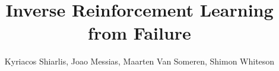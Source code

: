 \documentclass[conference]{IEEEtran}
\begin{document}
\title{Inverse Reinforcement Learning from Failure}

\author{Kyriacos Shiarlis, Joao Messias, Maarten Van Someren, Shimon Whiteson}





% 


\maketitle
\end{document}

